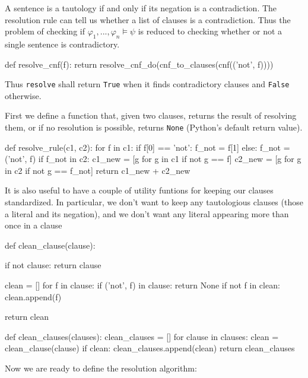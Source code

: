 \documentclass[a4paper,notitlepage]{scrartcl}
\let\phi\varphi
\begin{document}
A sentence is a tautology if and only if its negation is a contradiction.
The resolution rule can tell us whether a list of clauses is a contradiction.
Thus the problem of checking if $\phi_1,...,\phi_n\models\psi$ is reduced
   to checking whether or not a single sentence is contradictory.

\begin{code}
def resolve_cnf(f):
    return resolve_cnf_do(cnf_to_clauses(cnf(('not', f))))
\end{code}

Thus \texttt{resolve} shall return \texttt{True} when it finds 
   contradictory clauses and \texttt{False} otherwise.

First we define a function that, given two clauses, returns the result
   of resolving them, or if no resolution is possible, returns 
   \texttt{None} (Python's default return value).

\begin{code}

def resolve_rule(c1, c2):
    for f in c1:
        if f[0] == 'not':
            f_not = f[1]
        else:
            f_not = ('not', f)
        if f_not in c2:
            c1_new = [g for g in c1 if not g == f]
            c2_new = [g for g in c2 if not g == f_not] 
            return c1_new + c2_new
\end{code}

It is also useful to have a couple of utility funtions for keeping our
   clauses standardized.
In particular, we don't want to keep any tautologious clauses (those
   a literal and its negation), and we don't want any literal
   appearing more than once in a clause

\begin{code}

def clean_clause(clause):

    if not clause:
        return clause

    clean = []
    for f in clause:
        if ('not', f) in clause:
            return None
        if not f in clean:
            clean.append(f)

    return clean


def clean_clauses(clauses):
    clean_clauses = []
    for clause in clauses:
        clean = clean_clause(clause)
        if clean:
            clean_clauses.append(clean)
    return clean_clauses

\end{code}

Now we are ready to define the resolution algorithm:
\end{document}
